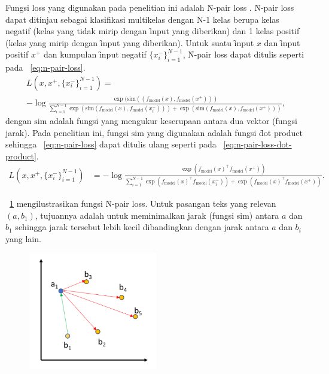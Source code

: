 Fungsi loss yang digunakan pada penelitian ini adalah \f{N-pair loss} \citep{InfoNCE}. \f{N-pair loss} dapat ditinjau sebagai klasifikasi multikelas dengan N-1 kelas berupa kelas negatif (kelas yang tidak mirip dengan \f{input} yang diberikan) dan 1 kelas positif (kelas yang mirip dengan \f{input} yang diberikan). Untuk suatu \f{input} $x$ dan \f{input} positif $x^+$ dan kumpulan \f{input} negatif $\{x^-_i\}_{i=1}^{N-1}$, \f{N-pair loss} dapat ditulis seperti pada \equ~\ref{eq:n-pair-loss}.
\begin{align}
\label{eq:n-pair-loss}
\nonumber
 L(x, x^+, \{x^-_i\}_{i=1}^{N-1}) = \\
 -\log\frac{\exp(\text{sim}((f_\text{model}(x), f_\text{model}(x^+)))}{\sum_{i=1}^{N-1} \exp(\text{sim}(f_\text{model}(x), f_\text{model}(x^-_i)))+\exp(\text{sim}(f_\text{model}(x), f_\text{model}(x^+)))},
\end{align}
dengan $\text{sim}$ adalah fungsi yang mengukur keserupaan antara dua vektor (fungsi jarak). Pada penelitian ini, fungsi $\text{sim}$ yang digunakan adalah fungsi \f{dot product} sehingga \equ~\ref{eq:n-pair-loss} dapat ditulis ulang seperti pada \equ~\ref{eq:n-pair-loss-dot-product}.
\begin{align}
\label{eq:n-pair-loss-dot-product}
 L(x, x^+, \{x^-_i\}_{i=1}^{N-1}) &= -\log\frac{\exp(f_\text{model}(x)^{\top}f_\text{model}(x^+))}{\sum_{i=1}^{N-1} \exp(f_\text{model}(x)^{\top}f_\text{model}(x^-_i))+\exp(f_\text{model}(x)^{\top}f_\text{model}(x^+))}.
\end{align}

\pic~\ref{fig:n-pair-loss} mengilustrasikan fungsi \f{N-pair loss}. Untuk pasangan teks yang relevan $(a, b_1)$, tujuannya adalah untuk meminimalkan jarak (fungsi sim) antara $a$ dan $b_1$ sehingga jarak tersebut lebih kecil dibandingkan dengan jarak antara $a$ dan $b_i$ yang lain.
\begin{figure}[!ht]
    \centering
    \includegraphics[width=0.5\textwidth]{assets/pics/InfoNCE.png}
    \label{fig:n-pair-loss}
\end{figure}

















        

